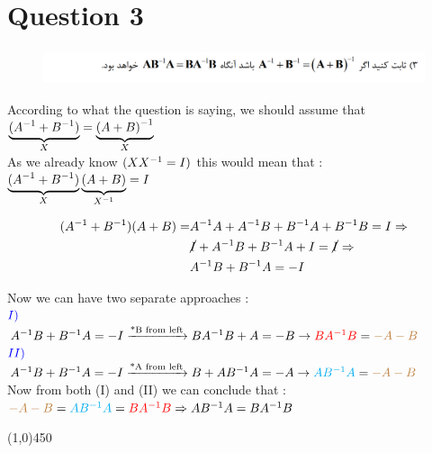 \documentclass[a4paper,12pt]{article}
\begin{document}
\section {Question 3 }

\begin{figure}[h!]
	\centering
	\includegraphics*[height=1cm]{Q3}
\end{figure}

\begin{doublespace}
According to what the question is saying, we should assume that $ \underbrace{({A}^{-1} + {B}^{-1}) }_{X} = \underbrace{{(A + B)}^{-1}}_{X} $\\
As we already know $( X{X}^{-1} = I) $ this would mean that : $\underbrace{({A}^{-1} + {B}^{-1}) }_{X}  \underbrace{(A + B)}_{ {X}^{-1} }     = I $
\end{doublespace}


	 \begin{align*}
		({A}^{-1} + {B}^{-1}) (A + B)  =  & {A}^{-1}A + {A}^{-1}B + {B}^{-1}A  + {B}^{-1}B  = I \Rightarrow\\
		& \cancel{I} + {A}^{-1}B + {B}^{-1}A + I  = \cancel{I} \Rightarrow\\
		&  {A}^{-1}B + {B}^{-1}A   = -I\\
	 \end{align*}

\begin{doublespace}

Now we can have two separate approaches :\\
$\textcolor {blue}{I)}$\\
$ {A}^{-1}B + {B}^{-1}A   = -I \xrightarrow{\text{*B from left}} B{A}^{-1}B + A = -B \rightarrow  \textcolor{red}{B{A}^{-1}B}  = \textcolor{brown}{-A-B} $ \\
$\textcolor {blue}{II)}$\\
$ {A}^{-1}B + {B}^{-1}A   = -I \xrightarrow{\text{*A from left}}  B + A{B}^{-1}A = -A \rightarrow  \textcolor{cyan}{A{B}^{-1}A}  = \textcolor{brown}{-A-B} $ \\
Now from both (I) and (II) we can conclude that : \\
$ \textcolor{brown}{-A-B} = \textcolor{cyan}{A{B}^{-1}A} = \textcolor{red}{B{A}^{-1}B} \Rightarrow  A{B}^{-1}A = B{A}^{-1}B $
\end{doublespace}
\line(1,0){450}
\end{document}
